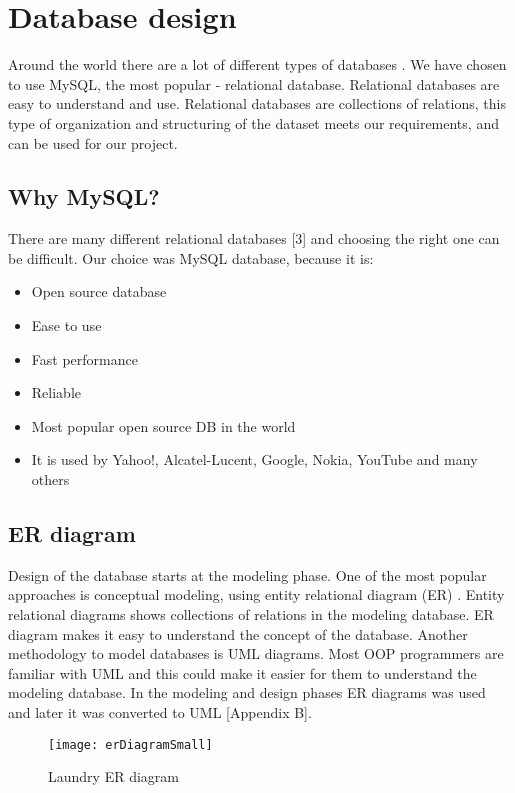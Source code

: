 %
\section{Database design}

Around the world there are a lot of different types of databases \cite{bib1}. We have chosen to use MySQL, the most popular - relational database. Relational databases are easy to understand \cite{bib2} and use. Relational databases are collections of relations, this type of organization and structuring of the dataset meets our requirements, and can be used for our project.

\subsection{Why MySQL?}

There are many different relational databases [3] and choosing the right one can be difficult. Our choice was MySQL database, because it is:

\begin{itemize}
	\item Open source database
	\item Ease to use
	\item Fast performance
	\item Reliable 
	\item Most popular open source DB in the world
	\item It is used by Yahoo!, Alcatel-Lucent, Google, Nokia, YouTube and many others
\end{itemize}

\subsection{ER diagram}

Design of the database starts at the modeling phase. One of the most popular approaches is conceptual modeling, using entity relational diagram (ER) \cite{bib4}. Entity relational diagrams shows collections of relations in the modeling database. ER diagram makes it easy to understand the concept of the database. Another methodology to model databases is UML diagrams. Most OOP programmers are familiar with UML and this could make it easier for them to understand the modeling database. In the modeling and design phases ER diagrams was used and later it was converted to UML [Appendix B].

\begin{figure}[h]
	\centering
		\texttt{[image: erDiagramSmall]}
	\caption{Laundry ER diagram}
	\label{fig:planning}
\end{figure}

